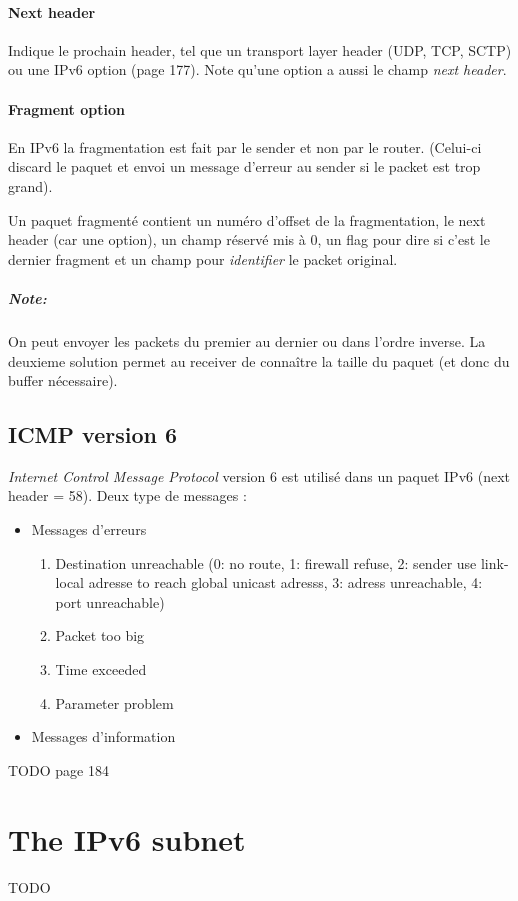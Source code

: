 \documentclass{report}
\begin{document}
\paragraph{Next header}
Indique le prochain header, tel que un transport layer header (UDP, TCP, SCTP) ou une
IPv6 option (page 177). Note qu'une option a aussi le champ \textit{next header}.

\paragraph{Fragment option}
En IPv6 la fragmentation est fait par le sender et non par le router. (Celui-ci discard
le paquet et envoi un message d'erreur au sender si le packet est trop grand).

Un paquet fragmenté contient un numéro d'offset de la fragmentation, le next header (car une option), un champ réservé mis à 0, un flag pour dire si c'est le dernier fragment et un
champ pour \textit{identifier} le packet original.

\subparagraph{Note:} On peut envoyer les packets du premier au dernier ou dans l'ordre inverse.
La deuxieme solution permet au receiver de connaître la taille du paquet (et donc du buffer
nécessaire).

\subsection{ICMP version 6}
\textit{Internet Control Message Protocol} version 6 est utilisé dans un paquet IPv6 
(next header = 58). Deux type de messages :

\begin{itemize}
    \item Messages d'erreurs 
        \begin{enumerate}
            \item Destination unreachable (0: no route, 1: firewall refuse, 2: sender use link-local adresse to reach global unicast adresss, 3: adress unreachable, 4: port unreachable)
            \item Packet too big
            \item Time exceeded
            \item Parameter problem
        \end{enumerate}
    \item Messages d'information
\end{itemize}
TODO page 184

\section{The IPv6 subnet}
TODO
\end{document}
